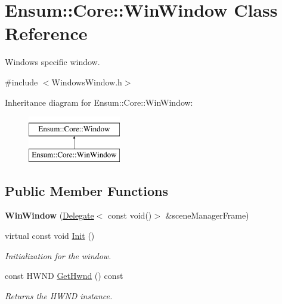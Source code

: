 \hypertarget{class_ensum_1_1_core_1_1_win_window}{}\section{Ensum\+:\+:Core\+:\+:Win\+Window Class Reference}
\label{class_ensum_1_1_core_1_1_win_window}


Windows specific window.  




{\ttfamily \#include $<$Windows\+Window.\+h$>$}

Inheritance diagram for Ensum\+:\+:Core\+:\+:Win\+Window\+:\begin{figure}[H]
\begin{center}
\leavevmode
\includegraphics[height=2.000000cm]{class_ensum_1_1_core_1_1_win_window}
\end{center}
\end{figure}
\subsection*{Public Member Functions}
\begin{DoxyCompactItemize}
\item 
{\bfseries Win\+Window} (\hyperlink{class_ensum_1_1_delegate}{Delegate}$<$ const void()$>$ \&scene\+Manager\+Frame)\hypertarget{class_ensum_1_1_core_1_1_win_window_a486f2e174483bce9d547b34f29867034}{}\label{class_ensum_1_1_core_1_1_win_window_a486f2e174483bce9d547b34f29867034}

\item 
virtual const void \hyperlink{class_ensum_1_1_core_1_1_win_window_afb59ce364f98918b2b17653cbfc39ead}{Init} ()\hypertarget{class_ensum_1_1_core_1_1_win_window_afb59ce364f98918b2b17653cbfc39ead}{}\label{class_ensum_1_1_core_1_1_win_window_afb59ce364f98918b2b17653cbfc39ead}

\begin{DoxyCompactList}\small\item\em Initialization for the window. \end{DoxyCompactList}\item 
const H\+W\+ND \hyperlink{class_ensum_1_1_core_1_1_win_window_a478777bf6b64a67076b58bcdfccb7791}{Get\+Hwnd} () const \hypertarget{class_ensum_1_1_core_1_1_win_window_a478777bf6b64a67076b58bcdfccb7791}{}\label{class_ensum_1_1_core_1_1_win_window_a478777bf6b64a67076b58bcdfccb7791}

\begin{DoxyCompactList}\small\item\em Returns the H\+W\+ND instance. \end{DoxyCompactList}\end{DoxyCompactItemize}
